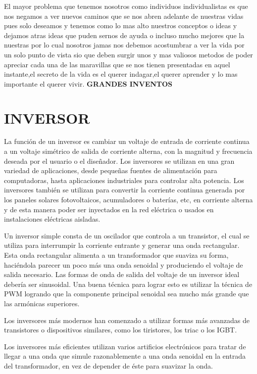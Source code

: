 \documentclass[12pt]{article}
\begin{document}
\vspace{15PT}
El mayor problema que tenemos nosotros como individuos individualistas es que nos negamos a ver nuevos caminos que se nos abren adelante de nuestras vidas pues solo deseamos y tenemos como lo mas alto nuestros conceptos o ideas y dejamos atras ideas que puden sernos de ayuda o incluso mucho mejores que la nuestras por lo cual nosotros jamas nos debemos acostumbrar a ver la vida por un solo punto de vista sio que deben surgir unos y mas valiosos metodos de poder apreciar cada una de las maravillas que se nos tienen presentadas en aquel instante,el secreto de la vida es el querer indagar,el querer aprender y lo mas importante el querer vivir.
\newpage
\bf{\sc\Huge GRANDES INVENTOS}
\section{INVERSOR}
\large
La función de un inversor es cambiar un voltaje de entrada de corriente continua a un voltaje simétrico de salida de corriente alterna, con la magnitud y frecuencia deseada por el usuario o el diseñador. Los inversores se utilizan en una gran variedad de aplicaciones, desde pequeñas fuentes de alimentación para computadoras, hasta aplicaciones industriales para controlar alta potencia. Los inversores también se utilizan para convertir la corriente continua generada por los paneles solares fotovoltaicos, acumuladores o baterías, etc, en corriente alterna y de esta manera poder ser inyectados en la red eléctrica o usados en instalaciones eléctricas aisladas.

\vspace{15PT}
Un inversor simple consta de un oscilador que controla a un transistor, el cual se utiliza para interrumpir la corriente entrante y generar una onda rectangular.
Esta onda rectangular alimenta a un transformador que suaviza su forma, haciéndola parecer un poco más una onda senoidal y produciendo el voltaje de salida necesario. Las formas de onda de salida del voltaje de un inversor ideal debería ser sinusoidal. Una buena técnica para lograr esto es utilizar la técnica de PWM logrando que la componente principal senoidal sea mucho más grande que las armónicas superiores.

\vspace{15PT}
Los inversores más modernos han comenzado a utilizar formas más avanzadas de transistores o dispositivos similares, como los tiristores, los triac o los IGBT.

\vspace{15PT}
Los inversores más eficientes utilizan varios artificios electrónicos para tratar de llegar a una onda que simule razonablemente a una onda senoidal en la entrada del transformador, en vez de depender de éste para suavizar la onda.

\end{document}
